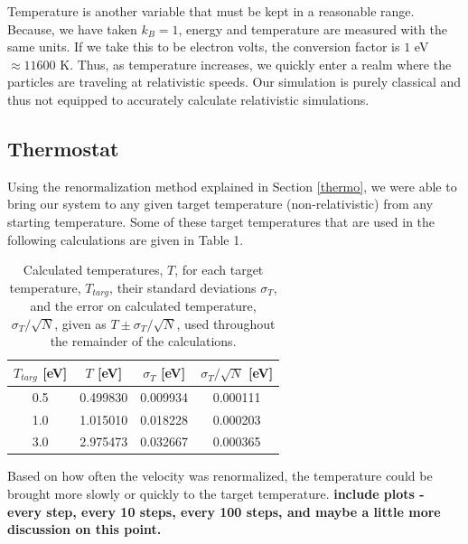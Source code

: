\documentclass{article}
\begin{document}
\begin{multicols}{2}
Temperature is another variable that must be kept in a reasonable range.  Because, we have taken $k_B =1$, energy and temperature are measured with the same units.  If we take this to be electron volts, the conversion factor is $1 $ eV $\approx 11600$ K.  Thus, as temperature increases, we quickly enter a realm where the particles are traveling at relativistic speeds.  Our simulation is purely classical and thus not equipped to accurately calculate relativistic simulations.

\subsection{Thermostat}

Using the renormalization method explained in Section \ref{thermo}, we were able to bring our system to any given target temperature (non-relativistic) from any starting temperature.  Some of these target temperatures that are used in the following calculations are given in Table 1.  \\

\begin{table}
\begin{center}
\begin{tabular}{| c | c | c | c |}
\hline $T_{targ}$ [eV] & $T$ [eV] & $\sigma_T$ [eV] & $\sigma_T/\sqrt{N}$ [eV] \\ \hline
 0.5 & 0.499830 & 0.009934 & 0.000111 \\ \hline
1.0 & 1.015010 & 0.018228 & 0.000203  \\ \hline
3.0 & 2.975473 & 0.032667 & 0.000365 \\ \hline
\end{tabular}
\label{temptable}
\caption{Calculated temperatures, $T$, for each target temperature, $T_{targ}$, their standard deviations $\sigma _T$, and the error on calculated temperature, $\sigma _T/\sqrt{N}$, given as $T \pm \sigma_T /\sqrt{N}$, used throughout the remainder of the calculations.}
\end{center}
\end{table}

Based on how often the velocity was renormalized, the temperature could be brought more slowly or quickly to the target temperature.  \textbf{include plots - every step, every 10 steps, every 100 steps, and maybe a little more discussion on this point.}


\end{multicols}
\end{document}
